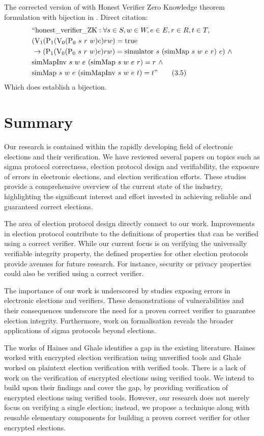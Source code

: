 The corrected version of with Honest Verifier Zero Knowledge theorem formulation with bijection in \cite{Haines2021DidYM}. Direct citation:
\begin{align*}
&\text{{``honest\_verifier\_ZK}} : \forall s \in S, w \in W, e \in E, r \in R, t \in T,  \\
&(\text{{V}}_{1} (\text{{P}}_{1}(\text{{V}}_{0} (\text{{P}}_{0}\ s\ r\ w) e) r w) = \text{{true}}  \\
&\rightarrow (\text{{P}}_{1}(\text{{V}}_{0} (\text{{P}}_{0}\ s\ r\ w) e) r w) = \text{{simulator}}\ s\  (\text{{simMap}}\ s\ w\ e\ r)\ e)  \ \land  \\
&\text{{simMapInv}}\ s\ w\ e\ (\text{{simMap}}\ s\ w\ e\ r) = r  \ \land \\
&\text{{simMap}}\ s\ w\ e\ (\text{{simMapInv}}\ s\ w\ e\ t) = t" \tag{3.5}
\end{align*}
Which does establish a bijection. 


\section{Summary}
Our research is contained within the rapidly developing field of electronic elections and their verification. We have reviewed several papers on topics such as sigma protocol correctness, election protocol design and verifiability, the exposure of errors in electronic elections, and election verification efforts. These studies provide a comprehensive overview of the current state of the industry, highlighting the significant interest and effort invested in achieving reliable and guaranteed correct elections.

The area of election protocol design directly connect to our work. Improvements in election protocol contribute to the definitions of properties that can be verified using a correct verifier. While our current focus is on verifying the universally verifiable integrity property, the defined properties for other election protocols provide avenues for future research. For instance, security or privacy properties could also be verified using a correct verifier.

The importance of our work is underscored by studies exposing errors in electronic elections and verifiers. These demonstrations of vulnerabilities and their consequences underscore the need for a proven correct verifier to guarantee election integrity. Furthermore, work on formalisation reveals the broader applications of sigma protocols beyond elections.

The works of Haines and Ghale \cite{Haines2019VerifiedVF, Ghale2018VerifiedCC} identifies a gap in the existing literature. Haines worked with encrypted election verification using unverified tools and Ghale worked on plaintext election verification with verified tools. There is a lack of work on the verification of encrypted elections using verified tools. We intend to build upon their findings and cover the gap, by providing verification of encrypted elections using verified tools. However,  our research does not merely focus on verifying a single election; instead, we propose a technique along with reusable elementary components for building a proven correct verifier for other encrypted elections.